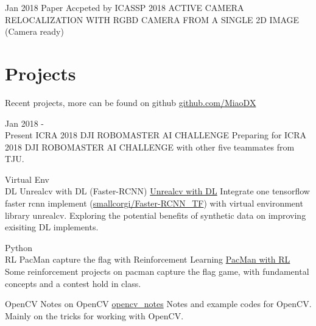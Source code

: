 \documentclass[letterpaper]{twentysecondcv} %
\begin{document}
\begin{twenty}
    \twentyitem
        {Jan 2018}
        {Paper Accpeted by ICASSP 2018}
        {}
        {}
        {ACTIVE CAMERA RELOCALIZATION WITH RGBD CAMERA
FROM A SINGLE 2D IMAGE (Camera ready)}
\end{twenty}

\section{Projects}
\begin{twenty}

    \twentyitem
        {}
        {Recent projects, more can be found on github}
        {\href{https://github.com/MiaoDX/}{github.com/MiaoDX}}
        {}
          {}
          
    \twentyitem
    {Jan 2018 - \\ Present}
    {ICRA 2018 DJI ROBOMASTER AI CHALLENGE}
    {}
    {}
    {Preparing for ICRA 2018 DJI ROBOMASTER AI CHALLENGE with other five teammates from TJU.}              
          
          
    \twentyitem
        {Virtual Env \\ DL}
        {Unrealcv with DL (Faster-RCNN)}
        {\href{https://github.com/MiaoDX/unrealcv_examples/}{Unrealcv with DL}}
        {}
        {Integrate one tensorflow faster rcnn implement (\href{https://github.com/smallcorgi/Faster-RCNN\_TF}{smallcorgi/Faster-RCNN\_TF}) with virtual environment library unrealcv. Exploring the potential benefits of synthetic data on improving exisiting DL implements.}          
                 
    \twentyitem
        {Python \\ RL}
        {PacMan capture the flag with Reinforcement Learning}
        {\href{https://github.com/MiaoDX/hand_in_homework/tree/master/Advanced\_AI/}{PacMan with RL}}
        {}
        {Some reinforcement projects on pacman capture the flag game, with fundamental concepts and a contest hold in class.}


    \twentyitem
        {OpenCV}
        {Notes on OpenCV}
        {\href{https://github.com/MiaoDX/opencv\_projects/}{opencv\_notes}}
        {}
        {Notes and example codes for OpenCV. Mainly on the tricks for working with OpenCV.}

\end{twenty}
\end{document}
